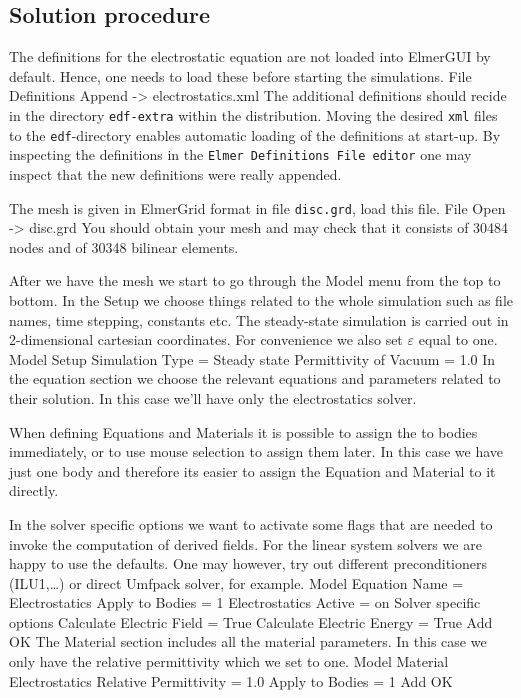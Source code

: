 \subsection*{Solution procedure}

The definitions for the electrostatic equation are not loaded into ElmerGUI by default. Hence, 
one needs to load these before starting the simulations.
\ttbegin
File 
  Definitions
    Append -> electrostatics.xml
\ttend
The additional definitions should recide in the directory \texttt{edf-extra} within the distribution.
Moving the desired \texttt{xml} files to the \texttt{edf}-directory enables automatic loading of the 
definitions at start-up. By inspecting the definitions in the \texttt{Elmer Definitions File editor} one
may inspect that the new definitions were really appended. 


The mesh is given in ElmerGrid format in file \texttt{disc.grd}, load this file.
\ttbegin
File 
  Open -> disc.grd
\ttend
You should obtain your mesh and may check that it consists of 30484 nodes and of 30348 bilinear elements.


After we have the mesh we start to go through the Model menu from the top to bottom. 
In the Setup we choose things related to the whole simulation such as file names, 
time stepping, constants etc.
The steady-state simulation is carried out in 2-dimensional cartesian
coordinates. For convenience we also set $\varepsilon$ equal to one. 
\ttbegin
Model
  Setup 
    Simulation Type = Steady state
    Permittivity of Vacuum = 1.0
\ttend
In the equation section we choose the relevant equations and parameters related to their solution. 
In this case we'll have only the electrostatics solver. 

When defining Equations and Materials it is possible to assign the to bodies immediately, or to use mouse
selection to assign them later. In this case we have just one body and therefore its easier to assign 
the Equation and Material to it directly.

In the solver specific options we want to activate some flags that are needed to invoke the 
computation of derived fields. 
For the linear system solvers we are happy to use the defaults. One may however, try out different
preconditioners (ILU1,\ldots) or direct Umfpack solver, for example.
\ttbegin
Model
  Equation
    Name = Electrostatics
    Apply to Bodies = 1
    Electrostatics
      Active = on
      Solver specific options
        Calculate Electric Field = True
        Calculate Electric Energy = True
    Add 
    OK
\ttend        
The Material section includes all the material parameters.
In this case we only have the relative permittivity which we set to one.
\ttbegin
Model
  Material
    Electrostatics
      Relative Permittivity = 1.0
    Apply to Bodies = 1 
    Add
    OK
\ttend

